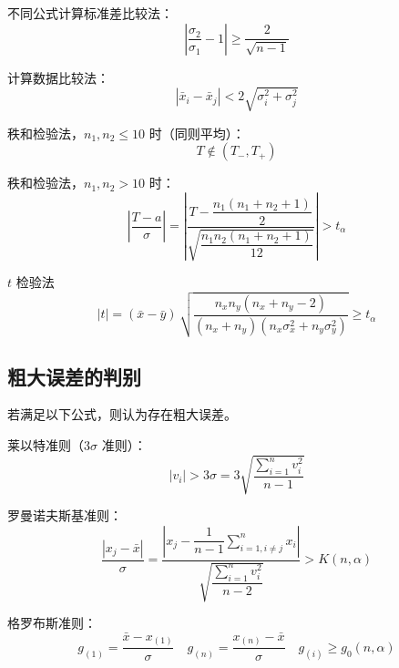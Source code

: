 \documentclass[12pt,a4paper]{ctexart}
\begin{document}
不同公式计算标准差比较法：
\begin{equation*}
\left|\frac{\sigma_2}{\sigma_1}-1\right|\geq \frac{2}{\sqrt{n-1}}
\end{equation*}

计算数据比较法：
\begin{equation*}
|\bar{x}_i-\bar{x}_j|<2\sqrt{\sigma_i^2+\sigma_j^2}
\end{equation*}

秩和检验法，$n_1,n_2\leq 10$ 时（同则平均）：
\begin{equation*}
T\notin(T_-,T_+)
\end{equation*}

秩和检验法，$n_1,n_2>10$ 时：
\begin{equation*}
\left|\frac{T-a}{\sigma}\right|
=
\left|
\frac{T-\dfrac{n_1(n_1+n_2+1)}{2}}
{\sqrt{\dfrac{n_1n_2(n_1+n_2+1)}{12}}}
\right|
>t_{\alpha}
\end{equation*}

$t$ 检验法
\begin{equation*}
|t|
=
(\bar{x}-\bar{y})\,
\sqrt{
\frac{n_x n_y (n_x+n_y-2)}
{(n_x+n_y)(n_x \sigma_x^2+n_y \sigma_y^2)}
}
\geq t_\alpha
\end{equation*}

\subsection{粗大误差的判别}

若满足以下公式，则认为存在粗大误差。

莱以特准则（$3\sigma$ 准则）：
\begin{equation*}
|v_i|>3\sigma=3\sqrt{\frac{\sum_{i=1}^{n}v_i^2}{n-1}}
\end{equation*}

罗曼诺夫斯基准则：
\begin{equation*}
\frac{|x_j-\bar{x}|}{\sigma}
=
\frac{
\left|x_j-\dfrac{1}{n-1}\sum_{i=1,i\neq j}^{n}x_i\right|
}{
\sqrt{\dfrac{\sum_{i=1}^{n}v_i^2}{n-2}}
}
>K(n,\alpha)
\end{equation*}

格罗布斯准则：
\begin{equation*}
g_{(1)}=\frac{\bar{x}-x_{(1)}}{\sigma}
\quad
g_{(n)}=\frac{x_{(n)}-\bar{x}}{\sigma}
\quad
g_{(i)}\geq g_0(n,\alpha)
\end{equation*}
\end{document}
